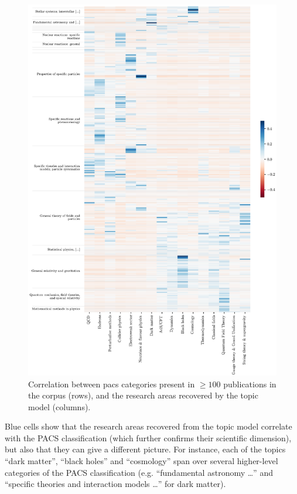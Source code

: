 \documentclass{article}
\begin{document}
\begin{figure}[H]
    \centering
    \includegraphics[height=0.73\paperheight
]{Fig11.eps}
    \caption{Correlation between \gls{pacs} categories present in $\geq 100$ publications in the corpus (rows), and the research areas recovered by the topic model (columns).}
\end{figure}

Blue cells show that the research areas recovered from the topic model correlate with the PACS classification (which further confirms their scientific dimension), but also that they can give a different picture. For instance, each of the topics  ``dark matter'', ``black holes'' and ``cosmology'' span over several higher-level categories of the PACS classification (e.g. ``fundamental astronomy \dots'' and ``specific theories and interaction models \dots'' for dark matter).
\end{document}
